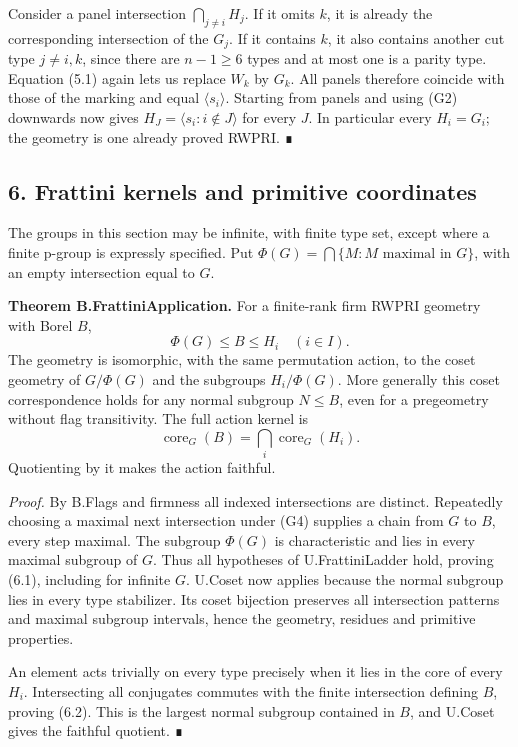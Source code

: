 \documentclass[
  11pt,
  a4paper,
]{article}
\begin{document}
Consider a panel intersection \(\bigcap_{j\ne i}H_j\). If it omits
\(k\), it is already the corresponding intersection of the \(G_j\). If
it contains \(k\), it also contains another cut type \(j\ne i,k\), since
there are \(n-1\geq6\) types and at most one is a parity type. Equation
(5.1) again lets us replace \(W_k\) by \(G_k\). All panels therefore
coincide with those of the marking and equal \(\langle s_i\rangle\).
Starting from panels and using (G2) downwards now gives
\(H_J=\langle s_i:i\notin J\rangle\) for every \(J\). In particular
every \(H_i=G_i\); the geometry is one already proved RWPRI. ∎

\subsection{6. Frattini kernels and primitive
coordinates}\label{frattini-kernels-and-primitive-coordinates}

The groups in this section may be infinite, with finite type set, except
where a finite p-group is expressly specified. Put
\(\Phi(G)=\bigcap\{M:M\text{ maximal in }G\}\), with an empty
intersection equal to \(G\).

\textbf{Theorem B.FrattiniApplication.} For a finite-rank firm RWPRI
geometry with Borel \(B\), \[
\Phi(G)\leq B\leq H_i\quad(i\in I).
\tag{6.1}
\] The geometry is isomorphic, with the same permutation action, to the
coset geometry of \(G/\Phi(G)\) and the subgroups \(H_i/\Phi(G)\). More
generally this coset correspondence holds for any normal subgroup
\(N\leq B\), even for a pregeometry without flag transitivity. The full
action kernel is \[
\operatorname{core}_G(B)=\bigcap_i\operatorname{core}_G(H_i).
\tag{6.2}
\] Quotienting by it makes the action faithful.

\emph{Proof.} By B.Flags and firmness all indexed intersections are
distinct. Repeatedly choosing a maximal next intersection under (G4)
supplies a chain from \(G\) to \(B\), every step maximal. The subgroup
\(\Phi(G)\) is characteristic and lies in every maximal subgroup of
\(G\). Thus all hypotheses of U.FrattiniLadder hold, proving (6.1),
including for infinite \(G\). U.Coset now applies because the normal
subgroup lies in every type stabilizer. Its coset bijection preserves
all intersection patterns and maximal subgroup intervals, hence the
geometry, residues and primitive properties.

An element acts trivially on every type precisely when it lies in the
core of every \(H_i\). Intersecting all conjugates commutes with the
finite intersection defining \(B\), proving (6.2). This is the largest
normal subgroup contained in \(B\), and U.Coset gives the faithful
quotient. ∎
\end{document}
